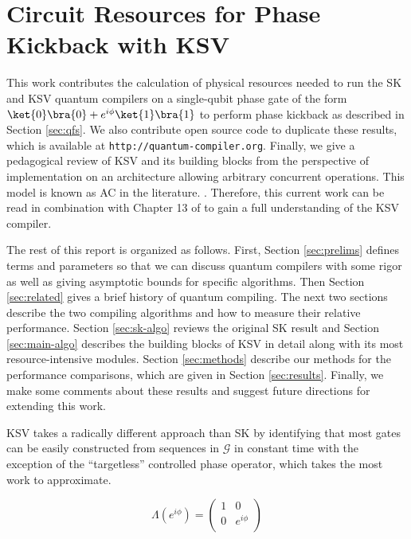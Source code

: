 \section{Circuit Resources for Phase Kickback with KSV}
\label{sec:ksv-resources}

This work contributes the calculation of physical resources needed
to run the SK and KSV quantum compilers on a single-qubit phase gate
of the form $\ket{0}\bra{0} + e^{i\phi}\ket{1}\bra{1}$ to perform phase
kickback as described in Section \ref{sec:qfs}.
We also contribute open source code to duplicate
these results, which is available at \texttt{http://quantum-compiler.org}.
Finally, we give a pedagogical review of KSV and its building blocks from the
perspective of implementation on an architecture allowing arbitrary concurrent
operations. This model is known as \textsc{AC} in the literature.
\cite{VanMeter2008}. Therefore, this current work can be read in combination
with Chapter 13 of \cite{ksv02} to gain a full understanding of the KSV
compiler.

The rest of this report is organized as follows.
First, Section \ref{sec:prelims} defines terms and parameters
so that we can discuss quantum compilers with some rigor as well as
giving asymptotic bounds for specific algorithms.
Then Section
\ref{sec:related} gives a brief history of quantum compiling.
The next two sections describe the two compiling algorithms and how
to measure their relative performance.
Section \ref{sec:sk-algo} reviews the original SK result and
Section \ref{sec:main-algo} describes the building blocks of KSV in detail
along with its
most resource-intensive modules. Section \ref{sec:methods} describe
our methods for the performance comparisons, which are given in Section
\ref{sec:results}. Finally, we make some comments about these results
and suggest future directions for extending this work.

KSV takes a radically different approach than SK by identifying that most gates
can be easily constructed from sequences in
$\mathcal{G}$ in constant time with the exception of the ``targetless''
controlled phase operator, which takes the most work to approximate.

\begin{displaymath}
\Lambda(e^{i\phi}) = 
 \left(
  \begin{array}{cc}
    1 & 0 \\
    0 & e^{i\phi} \\
  \end{array} \right)
\end{displaymath}

